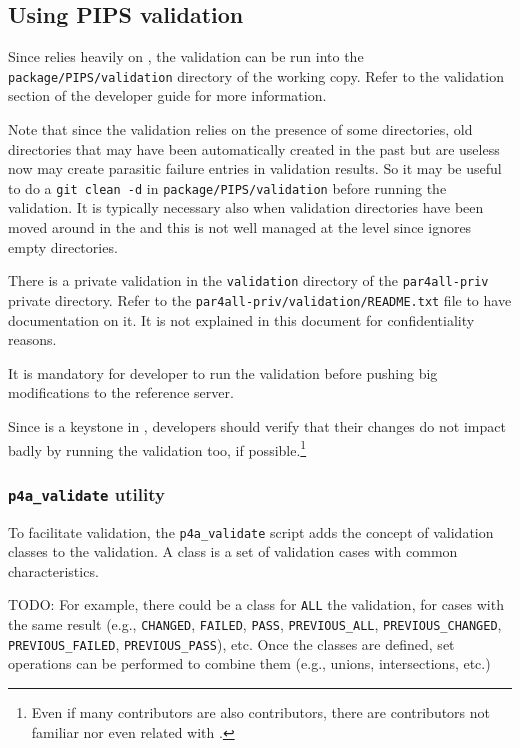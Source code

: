 \documentclass[a4paper]{article}
\begin{document}
\subsection{Using PIPS validation}
Since \Apfa relies heavily on \Apips, the \Apips validation can be run
into the \texttt{package/PIPS/validation} directory of the \Agit working
copy. Refer to the validation section of the \Apips developer guide for
more information.

Note that since the validation relies on the presence of some directories,
old directories that may have been automatically created in the past but
are useless now may create parasitic failure entries in validation
results. So it may be useful to do a \texttt{git clean -d} in
\texttt{package/PIPS/validation} before running the \Apips validation.  It
is typically necessary also when validation directories have been moved
around in the \Apips \Asvn and this is not well managed at the \Agit level
since \Agit ignores empty directories.

There is a private validation in the \texttt{validation} directory of the
\texttt{par4all-priv} private directory. Refer to the
\texttt{par4all-priv/validation/README.txt} file to have documentation on
it. It is not explained in this document for confidentiality reasons.

It is mandatory for \Apfa developer to run the validation before pushing
big modifications to the reference \Agit server.

Since \Apips is a keystone in \Apfa, \Apips developers should verify that
their changes do not impact badly \Apfa by running the validation too, if
possible.\footnote{Even if many \Apips contributors are also \Apfa
  contributors, there are \Apips contributors not familiar nor even
  related with \Apfa.}


\subsubsection{\protect\texttt{p4a\_validate} utility}
\label{sec:p4a_validate-utility}


To facilitate validation, the \verb|p4a_validate|
script adds the concept of validation classes to the \Apips
validation. A class is a set of validation cases with common characteristics.

TODO: For example, there could be a class for \texttt{ALL} the
validation, for cases with the same result (e.g.,
\texttt{CHANGED}, \texttt{FAILED}, \texttt{PASS}, \verb|PREVIOUS_ALL|,
\verb|PREVIOUS_CHANGED|, \verb|PREVIOUS_FAILED|, \verb|PREVIOUS_PASS|),
etc. Once the classes are defined, set operations can be performed to combine
them (e.g., unions, intersections, etc.)
\end{document}

